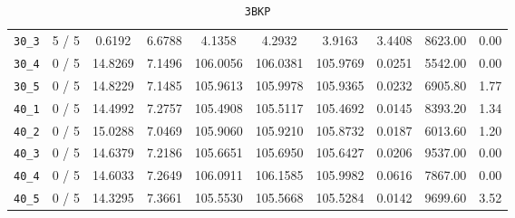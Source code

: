 \begin{table}[h!]
\begin{center}
\begin{tabular}{| c | c | c | c | c | c | c | c | c | c |}
\verb|30_3| & 5 / 5 & 0.6192 & 6.6788 & 4.1358 & 4.2932 & 3.9163 & 3.4408 & 8623.00 & 0.00\\ 
\verb|30_4| & 0 / 5 & 14.8269 & 7.1496 & 106.0056 & 106.0381 & 105.9769 & 0.0251 & 5542.00 & 0.00\\ 
\verb|30_5| & 0 / 5 & 14.8229 & 7.1485 & 105.9613 & 105.9978 & 105.9365 & 0.0232 & 6905.80 & 1.77\\ 
\verb|40_1| & 0 / 5 & 14.4992 & 7.2757 & 105.4908 & 105.5117 & 105.4692 & 0.0145 & 8393.20 & 1.34\\ 
\verb|40_2| & 0 / 5 & 15.0288 & 7.0469 & 105.9060 & 105.9210 & 105.8732 & 0.0187 & 6013.60 & 1.20\\ 
\verb|40_3| & 0 / 5 & 14.6379 & 7.2186 & 105.6651 & 105.6950 & 105.6427 & 0.0206 & 9537.00 & 0.00\\ 
\verb|40_4| & 0 / 5 & 14.6033 & 7.2649 & 106.0911 & 106.1585 & 105.9982 & 0.0616 & 7867.00 & 0.00\\ 
\verb|40_5| & 0 / 5 & 14.3295 & 7.3661 & 105.5530 & 105.5668 & 105.5284 & 0.0142 & 9699.60 & 3.52\\ 
\hline
\end{tabular}
\caption{\texttt{3BKP}}
\label{table:3BKP}
\end{center}
\end{table}



